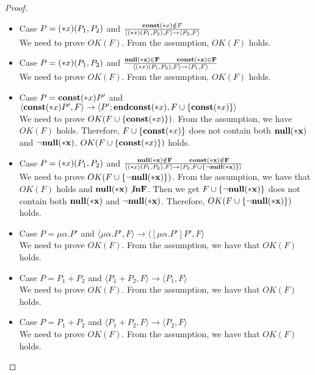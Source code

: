 \begin{proof}
\begin{itemize}
    \item Case \( P = (*x)(P_1,P_2)\) and \( \frac{\mathbf{const}(*x) \notin F}
      { \langle (*x)(P_1, P_2), F \rangle
      \rightarrow \langle P_2, F \rangle } \) \\
      We need to prove \( OK(F)\). From the assumption, \(OK(F)\) holds.

    \item Case \( P = (*x)(P_1,P_2)\) and \( \frac{ \bf{null}(*x) \in F \quad\quad \mathbf{const}(*x) \in F}
      { \langle (*x)(P_1, P_2), F \rangle
      \rightarrow \langle P_1, F \rangle } \) \\
      We need to prove \( OK(F)\). From the assumption, \(OK(F)\) holds.

    \item Case \( P = \mathbf{const}(*x) P'\) and \(  \langle \mathbf{const}(*x)
      P', F \rangle \rightarrow \langle P';\mathbf{endconst}(*x), F\cup\{\mathbf{const}(*x)\} \rangle \) \\
      We need to prove \( OK(F\cup\{\mathbf{const}(*x)\})\). From the
      assumption, we have \(OK(F)\) holds. Therefore,
      \(F\cup\{\mathbf{const}(*x)\}\) does not contain both \(\bf{null}(*x)\) and \(
      \neg\bf{null}(*x)\). \( OK(F\cup\{ \mathbf{const}(*x)\})\) holds.

    \item Case \( P = (*x)(P_1,P_2)\) and \( \frac{ \bf{null}(*x) \notin F \quad\quad \mathbf{const}(*x) \notin F}
      { \langle (*x)(P_1, P_2), F \rangle
      \rightarrow \langle P_2, F\cup\{\neg\bf{null}(*x)\} \rangle } \) \\
      We need to prove \( OK(F\cup\{\neg\bf{null}(*x)\})\). From the assumption,
      we have that \(OK(F)\) holds and \( \bf{null}(*x) \not in F\). Then we
      get \(F\cup\{\neg\bf{null}(*x)\}\) does not contain both \(\bf{null}(*x)\) and
      \(\neg\bf{null}(*x)\). Therefore, \( OK(F\cup\{\neg\bf{null}(*x)\})\) holds.


    \item Case \( P = \mu\alpha.P'\) and \( \langle \mu\alpha.P', F \rangle
      \rightarrow \langle [\mu\alpha.P']P', F \rangle \) \\
      We need to prove \( OK(F)\). From the assumption, we have that
      \(OK(F)\) holds.

    \item Case \( P = P_1 + P_2\) and \( \langle P_1 + P_2, F \rangle
      \rightarrow \langle P_1, F \rangle \) \\
      We need to prove \( OK(F)\). From the assumption, we have that
      \(OK(F)\) holds.

    \item Case \( P = P_1 + P_2\) and \(  \langle P_1 + P_2, F \rangle
      \rightarrow \langle P_2, F \rangle \) \\
      We need to prove \( OK(F)\). From the assumption, we have that
      \(OK(F)\) holds.


\end{itemize}
\end{proof}
